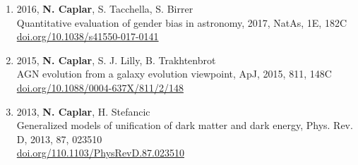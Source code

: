 \documentclass[11pt,letterpaper]{article}
\begin{document}
\begin{enumerate}
\item 2016, \textbf{N. Caplar}, S. Tacchella, S. Birrer \\ Quantitative evaluation of gender bias in astronomy,  2017, NatAs, 1E, 182C\\
\href{https://doi.org/10.1038/s41550-017-0141}{doi.org/10.1038/s41550-017-0141} \\ 

\item 2015,  \textbf{N. Caplar}, S. J. Lilly, B. Trakhtenbrot  \\AGN evolution from a galaxy evolution viewpoint, ApJ,  2015, 811, 148C \\
\href{https://doi.org/10.1088/0004-637X/811/2/148}{doi.org/10.1088/0004-637X/811/2/148} \\ 
  
 \item 2013,  \textbf{N. Caplar}, H. Stefancic  \\ Generalized models of unification of dark matter and dark energy, Phys. Rev. D, 2013, 87, 023510 \\
 \href{https://doi.org/10.1103/PhysRevD.87.023510}{doi.org/110.1103/PhysRevD.87.023510} \\ 

 
\end{enumerate}
\end{document}
